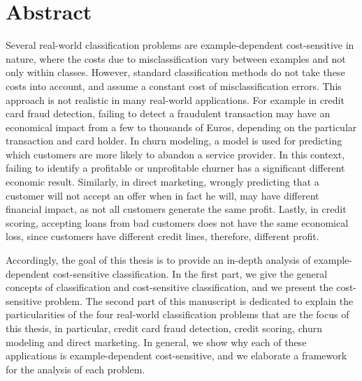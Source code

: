 \chapter*{Abstract}

Several real-world classification problems are example-dependent cost-sensitive in nature, where the 
costs due to misclassification vary between examples and not only within classes. However, standard 
classification methods do not take these costs into account, and assume a constant cost of 
misclassification errors. This approach is not realistic in many real-world applications. For  
example in credit card fraud detection, failing to detect a fraudulent transaction may have an 
economical impact from a few to thousands of Euros, depending on the particular transaction and card 
holder. In churn modeling, a model is used for predicting which customers are more likely to 
abandon a service provider. In this context, failing to identify a   profitable or unprofitable 
churner has a significant different economic   result. Similarly, in direct marketing, wrongly 
predicting that a customer   will not accept an offer when in fact he will, may have different 
financial impact, as not all   customers generate the same profit. Lastly, in credit scoring, 
accepting   loans from bad customers does not have the same economical loss, since customers have 
different   credit lines, therefore, different profit.

Accordingly, the goal of this thesis is to provide an in-depth analysis of example-dependent 
cost-sensitive classification. In the first part, we give the  general concepts of classification 
and cost-sensitive classification, and we present the cost-sensitive problem. The second part of 
this manuscript is dedicated to explain the particularities of the four real-world classification 
problems that are the focus of this thesis, in particular, credit card fraud detection, credit 
scoring, churn modeling and direct marketing. In general, we show why each of these applications is 
example-dependent cost-sensitive, and we elaborate a framework for the analysis of each problem. 

